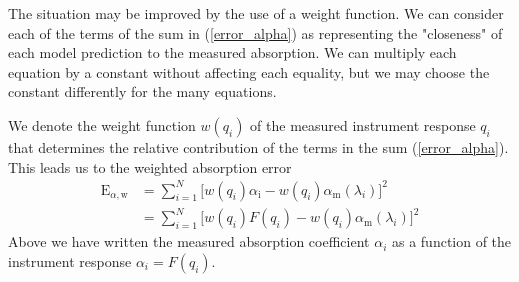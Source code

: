 \documentclass[12pt]{report}
\begin{document}
	The situation may be improved by the use of a weight function. We can consider each of the terms of the sum in (\ref{error_alpha}) as representing the "closeness" of each model prediction to the measured absorption. We can multiply each equation by a constant without affecting each equality, but we may choose the constant differently for the many equations. 
	
	We denote the weight function $w(q_i)$ of the measured instrument response $q_i$ that determines the relative contribution of the terms in the sum (\ref{error_alpha}). This leads us to the weighted absorption error
	\begin{align} \label{error_weighted}
		\mathrm{E}_{\alpha,\mathrm{w}} &= \sum_{i=1}^{N} \Big[w(q_i)\alpha_\mathrm{i} - w(q_i)\alpha_\mathrm{m}\left(\lambda_i\right) \Big]^2 \nonumber \\
		&= \sum_{i=1}^{N} \Big[w(q_i)F(q_i) - w(q_i)\alpha_\mathrm{m}\left(\lambda_i\right) \Big]^2
	\end{align}
	Above we have written the measured absorption coefficient $\alpha_i$ as a function of the instrument response $\alpha_i = F(q_i)$.
	
\end{document}
